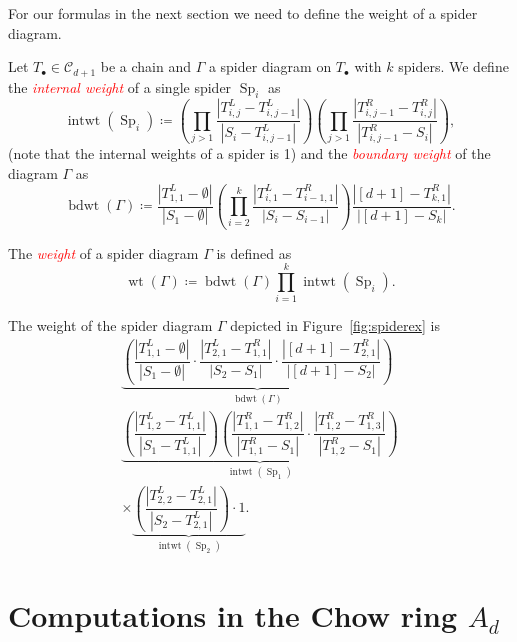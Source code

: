 \documentclass[ALCO,ThmDefs,Unicode,epreuves]{cedram}
\newcommand{\important}[1]{\emph{\textcolor{red}{#1}}}
\DeclareMathOperator{\wt}{wt}
\DeclareMathOperator{\intwt}{intwt}
\DeclareMathOperator{\bdwt}{bdwt}
\DeclareMathOperator{\Sp}{Sp}
\newcommand{\D}{{\Gamma}}
\newcommand{\CC}{\mathcal{C}}
\begin{document}
For our formulas in the next section we need to define the weight of a spider diagram.
\begin{defi}\label{def:weight}
	Let $T_\bullet\in\CC_{d+1}$ be a chain and $\D$ a spider diagram on $T_\bullet$ with $k$ spiders. 
	We define the \important{internal weight} of a single spider $\Sp_i$ as
	\begin{equation}%
	\intwt(\Sp_i)\coloneqq \left(\prod_{j>1}\dfrac{|T^L_{i,j}-T^L_{i,j-1}|}{|S_i-T^L_{i,j-1}|}\right)\left(\prod_{j>1}\dfrac{|T^R_{i,j-1}-T^R_{i,j}|}{|T^R_{i,j-1}-S_i|}\right), 
	\end{equation} 
	(note that the internal weights of a spider is 1) and the \important{boundary weight} of the diagram $\D$ as
	\begin{equation}%
	\bdwt(\D)\coloneqq \dfrac{|T^L_{1,1}-\emptyset|}{|S_1-\emptyset|}\left(\prod_{i=2}^{k}\dfrac{|T^L_{i,1}-T^R_{i-1,1}|}{|S_i-S_{i-1}|}\right)\dfrac{|[d+1]-T^R_{k,1}|}{|[d+1]-S_{k}|}.
	\end{equation}
	
	The \important{weight} of a spider diagram $\D$ is defined as
	\[
	\wt(\D)\coloneqq \bdwt(\D)\prod_{i=1}^{k} \intwt(\Sp_i).
	\]
\end{defi}
\begin{exam}
	The weight of the spider diagram $\D$ depicted in Figure~\ref{fig:spiderex} is
	\begin{multline*}
	\underbrace{\left(\dfrac{|T_{1,1}^L-\emptyset|}{|S_1-\emptyset|}\cdot\dfrac{|T_{2,1}^L-T_{1,1}^R|}{|S_2-S_{1}|}\cdot\dfrac{|[d+1]-T_{2,1}^R|}{|[d+1]-S_2|}\right)}_{\bdwt(\D)}\\
	\underbrace{\left(\dfrac{|T_{1,2}^L-T_{1,1}^L|}{|S_1-T_{1,1}^L|}\right)\left(\dfrac{|T_{1,1}^R-T_{1,2}^R|}{|T_{1,1}^R-S_1|}\cdot\dfrac{|T_{1,2}^R-T_{1,3}^R|}{|T_{1,2}^R-S_1|}\right)}_{\intwt(\Sp_1)}\\
	\times \underbrace{\left(\dfrac{|T_{2,2}^L-T_{2,1}^L|}{|S_2-T_{2,1}^L|}\right)\cdot 1}_{\intwt(\Sp_2)}.
	\end{multline*}
	
	
	
	
\end{exam}


\section{Computations in the Chow ring \texorpdfstring{$A_d$}{Ad}}\label{sec:gen}
\end{document}
